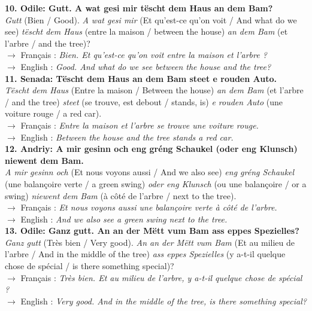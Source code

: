 \noindent\textbf{10. Odile: Gutt. A wat gesi mir tëscht dem Haus an dem Bam?}\\
\textit{Gutt} (Bien / Good). \textit{A wat gesi mir} (Et qu'est-ce qu'on voit / And what do we see) \textit{tëscht dem Haus} (entre la maison / between the house) \textit{an dem Bam} (et l'arbre / and the tree)?\\
$\rightarrow$ Français : \textit{Bien. Et qu'est-ce qu'on voit entre la maison et l'arbre ?}\\
$\rightarrow$ English : \textit{Good. And what do we see between the house and the tree?}\\[0.5em]

\noindent\textbf{11. Senada: Tëscht dem Haus an dem Bam steet e rouden Auto.}\\
\textit{Tëscht dem Haus} (Entre la maison / Between the house) \textit{an dem Bam} (et l'arbre / and the tree) \textit{steet} (se trouve, est debout / stands, is) \textit{e rouden Auto} (une voiture rouge / a red car).\\
$\rightarrow$ Français : \textit{Entre la maison et l'arbre se trouve une voiture rouge.}\\
$\rightarrow$ English : \textit{Between the house and the tree stands a red car.}\\[0.5em]

\noindent\textbf{12. Andriy: A mir gesinn och eng gréng Schaukel (oder eng Klunsch) niewent dem Bam.}\\
\textit{A mir gesinn och} (Et nous voyons aussi / And we also see) \textit{eng gréng Schaukel} (une balançoire verte / a green swing) \textit{oder eng Klunsch} (ou une balançoire / or a swing) \textit{niewent dem Bam} (à côté de l'arbre / next to the tree).\\
$\rightarrow$ Français : \textit{Et nous voyons aussi une balançoire verte à côté de l'arbre.}\\
$\rightarrow$ English : \textit{And we also see a green swing next to the tree.}\\[0.5em]

\noindent\textbf{13. Odile: Ganz gutt. An an der Mëtt vum Bam ass eppes Spezielles?}\\
\textit{Ganz gutt} (Très bien / Very good). \textit{An an der Mëtt vum Bam} (Et au milieu de l'arbre / And in the middle of the tree) \textit{ass eppes Spezielles} (y a-t-il quelque chose de spécial / is there something special)?\\
$\rightarrow$ Français : \textit{Très bien. Et au milieu de l'arbre, y a-t-il quelque chose de spécial ?}\\
$\rightarrow$ English : \textit{Very good. And in the middle of the tree, is there something special?}\\[0.5em]

